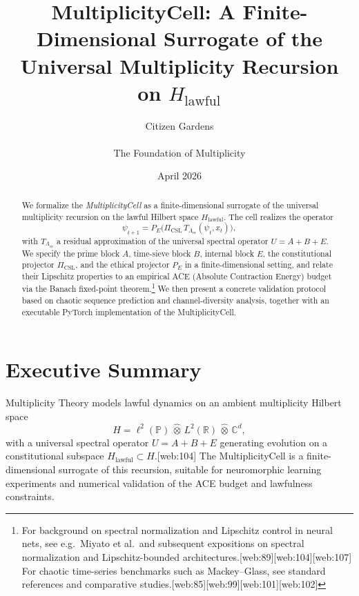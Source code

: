 \documentclass[11pt]{article}
\title{MultiplicityCell: A Finite-Dimensional Surrogate of the Universal Multiplicity Recursion on $H_{\mathrm{lawful}}$}
\author{Citizen Gardens \\ \\ The Foundation of Multiplicity}
\date{April 2026}
\theoremstyle{definition}
\theoremstyle{plain}
\begin{document}
\maketitle

\begin{abstract}
We formalize the \emph{MultiplicityCell} as a finite-dimensional surrogate of the universal multiplicity recursion on the lawful Hilbert space $H_{\mathrm{lawful}}$.
The cell realizes the operator
\[
  \psi_{t+1} = P_E\bigl(\Pi_{\mathrm{CSL}}\,T_{\Lambda_m}(\psi_t, x_t)\bigr),
\]
with $T_{\Lambda_m}$ a residual approximation of the universal spectral operator $U = A + B + E$.
We specify the prime block $A$, time-sieve block $B$, internal block $E$, the constitutional projector $\Pi_{\mathrm{CSL}}$, and the ethical projector $P_E$ in a finite-dimensional setting, and relate their Lipschitz properties to an empirical ACE (Absolute Contraction Energy) budget via the Banach fixed-point theorem.\footnote{For background on spectral normalization and Lipschitz control in neural nets, see e.g.\ Miyato et al.\ and subsequent expositions on spectral normalization and Lipschitz-bounded architectures.[web:89][web:104][web:107] For chaotic time-series benchmarks such as Mackey--Glass, see standard references and comparative studies.[web:85][web:99][web:101][web:102]} 
We then present a concrete validation protocol based on chaotic sequence prediction and channel-diversity analysis, together with an executable PyTorch implementation of the MultiplicityCell.
\end{abstract}

\section*{Executive Summary}

Multiplicity Theory models lawful dynamics on an ambient multiplicity Hilbert space
\[
  H = \ell^2(\mathbb{P}) \,\widehat{\otimes}\, L^2(\mathbb{R}) \,\widehat{\otimes}\, \mathbb{C}^d,
\]
with a universal spectral operator $U = A + B + E$ generating evolution on a constitutional subspace $H_{\mathrm{lawful}} \subset H$.[web:104]
The MultiplicityCell is a finite-dimensional surrogate of this recursion, suitable for neuromorphic learning experiments and numerical validation of the ACE budget and lawfulness constraints.
\end{document}
